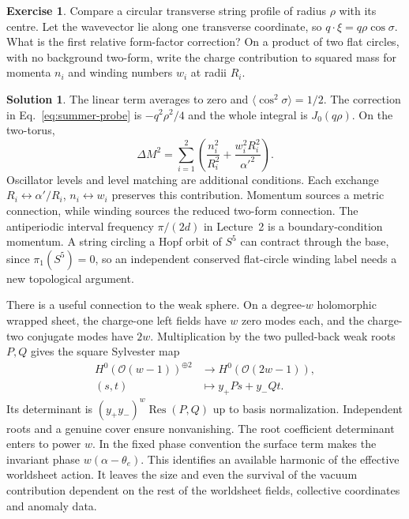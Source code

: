 \documentclass[10pt]{article}
\theoremstyle{definition}
\newtheorem{exercise}{Exercise}
\newtheorem{solution}{Solution}
\begin{document}
\begin{exercise}
Compare a circular transverse string profile of radius \(\rho\) with its centre. Let the wavevector lie along one transverse coordinate, so \(q\cdot\xi=q\rho\cos\sigma\). What is the first relative form-factor correction? On a product of two flat circles, with no background two-form, write the charge contribution to squared mass for momenta \(n_i\) and winding numbers \(w_i\) at radii \(R_i\).
\end{exercise}

\begin{solution}
The linear term averages to zero and \(\langle\cos^2\sigma\rangle=1/2\). The correction in Eq.~\eqref{eq:summer-probe} is \(-q^2\rho^2/4\) and the whole integral is \(J_0(q\rho)\). On the two-torus,
\begin{equation}
 \Delta M^2=\sum_{i=1}^2\left(\frac{n_i^2}{R_i^2}
                    +\frac{w_i^2R_i^2}{\alpha'^2}\right).
 \label{eq:summer-torus}
\end{equation}
Oscillator levels and level matching are additional conditions. Each exchange \(R_i\leftrightarrow\alpha'/R_i\), \(n_i\leftrightarrow w_i\) preserves this contribution. Momentum sources a metric connection, while winding sources the reduced two-form connection. The antiperiodic interval frequency \(\pi/(2d)\) in Lecture~2 is a boundary-condition momentum. A string circling a Hopf orbit of \(S^5\) can contract through the base, since \(\pi_1(S^5)=0\), so an independent conserved flat-circle winding label needs a new topological argument.
\end{solution}

There is a useful connection to the weak sphere. On a degree-\(w\) holomorphic wrapped sheet, the charge-one left fields have \(w\) zero modes each, and the charge-two conjugate modes have \(2w\). Multiplication by the two pulled-back weak roots \(P,Q\) gives the square Sylvester map
\begin{equation}
 \begin{aligned}
 H^0(\mathcal O(w-1))^{\oplus2}
       &\longrightarrow H^0(\mathcal O(2w-1)),\\
 (s,t)&\longmapsto y_+Ps+y_-Qt .
 \end{aligned}
\end{equation}
Its determinant is \((y_+y_-)^w\operatorname{Res}(P,Q)\) up to basis normalization. Independent roots and a genuine cover ensure nonvanishing. The root coefficient determinant enters to power \(w\). In the fixed phase convention the surface term makes the invariant phase \(w(\alpha-\theta_e)\). This identifies an available harmonic of the effective worldsheet action. It leaves the size and even the survival of the vacuum contribution dependent on the rest of the worldsheet fields, collective coordinates and anomaly data.
\end{document}
